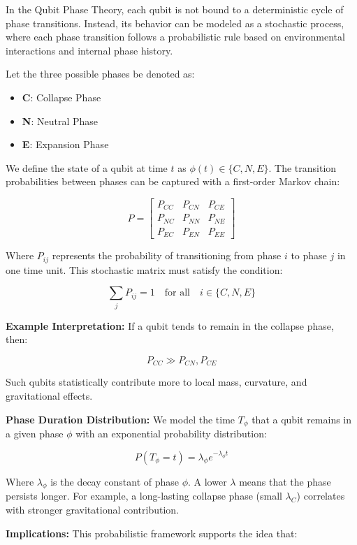 \documentclass[12pt]{report} %
\begin{document}
In the Qubit Phase Theory, each qubit is not bound to a deterministic cycle of phase transitions. Instead, its behavior can be modeled as a stochastic process, where each phase transition follows a probabilistic rule based on environmental interactions and internal phase history.

Let the three possible phases be denoted as:
\begin{itemize}
  \item \textbf{C}: Collapse Phase
  \item \textbf{N}: Neutral Phase
  \item \textbf{E}: Expansion Phase
\end{itemize}

We define the state of a qubit at time \( t \) as \( \phi(t) \in \{C, N, E\} \). The transition probabilities between phases can be captured with a first-order Markov chain:

\[
P =
\begin{bmatrix}
P_{CC} & P_{CN} & P_{CE} \\
P_{NC} & P_{NN} & P_{NE} \\
P_{EC} & P_{EN} & P_{EE}
\end{bmatrix}
\]

Where \( P_{ij} \) represents the probability of transitioning from phase \( i \) to phase \( j \) in one time unit. This stochastic matrix must satisfy the condition:

\[
\sum_j P_{ij} = 1 \quad \text{for all} \quad i \in \{C, N, E\}
\]

\textbf{Example Interpretation:}  
If a qubit tends to remain in the collapse phase, then:

\[
P_{CC} \gg P_{CN}, P_{CE}
\]

Such qubits statistically contribute more to local mass, curvature, and gravitational effects.

\vspace{0.5em}
\textbf{Phase Duration Distribution:}  
We model the time \( T_\phi \) that a qubit remains in a given phase \( \phi \) with an exponential probability distribution:

\[
P(T_\phi = t) = \lambda_\phi e^{-\lambda_\phi t}
\]

Where \( \lambda_\phi \) is the decay constant of phase \( \phi \). A lower \( \lambda \) means that the phase persists longer. For example, a long-lasting collapse phase (small \( \lambda_C \)) correlates with stronger gravitational contribution.

\vspace{0.5em}
\textbf{Implications:}  
This probabilistic framework supports the idea that:
\end{document}
